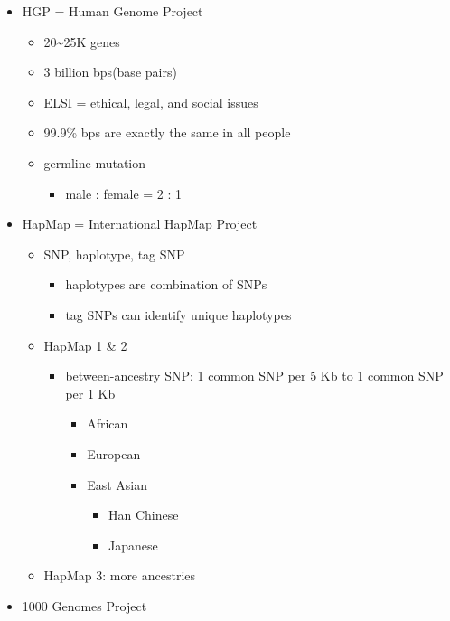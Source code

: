 \documentclass[
]{book}
\providecommand{\tightlist}{%
  \setlength{\itemsep}{0pt}\setlength{\parskip}{0pt}}
\theoremstyle{definition}
\theoremstyle{definition}
\theoremstyle{definition}
\theoremstyle{definition}
\theoremstyle{remark}
\begin{document}
\begin{itemize}
\tightlist
\item
  HGP = Human Genome Project

  \begin{itemize}
  \tightlist
  \item
    20\textasciitilde25K genes
  \item
    3 billion bps(base pairs)
  \item
    ELSI = ethical, legal, and social issues
  \item
    99.9\% bps are exactly the same in all people
  \item
    germline mutation

    \begin{itemize}
    \tightlist
    \item
      male : female = 2 : 1
    \end{itemize}
  \end{itemize}
\item
  HapMap = International HapMap Project

  \begin{itemize}
  \tightlist
  \item
    SNP, haplotype, tag SNP

    \begin{itemize}
    \tightlist
    \item
      haplotypes are combination of SNPs
    \item
      tag SNPs can identify unique haplotypes
    \end{itemize}
  \item
    HapMap 1 \& 2

    \begin{itemize}
    \tightlist
    \item
      between-ancestry SNP: 1 common SNP per 5 Kb to 1 common SNP per 1 Kb

      \begin{itemize}
      \tightlist
      \item
        African
      \item
        European
      \item
        East Asian

        \begin{itemize}
        \tightlist
        \item
          Han Chinese
        \item
          Japanese
        \end{itemize}
      \end{itemize}
    \end{itemize}
  \item
    HapMap 3: more ancestries
  \end{itemize}
\item
  1000 Genomes Project


\end{itemize}
\end{document}
